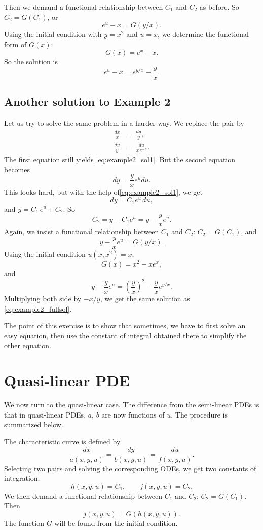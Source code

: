 \documentclass{article}
\begin{document}
Then we demand a functional relationship between $C_1$ and $C_2$ as before.
So $C_2 = G(C_1)$, or
$$
e^u - x = G(y/x).
$$
Using the initial condition with $y = x^2$ and $u = x$,
we determine the functional form of $G(x)$:
$$
G(x) = e^x - x.
$$
So the solution is
\begin{equation}
e^u - x = e^{y/x} - \frac{y}{x}.
\label{eq:example2_fullsol}
\end{equation}


\subsection{Another solution to Example 2}

Let us try to solve the same problem in a harder way.
We replace the pair by
$$
\begin{aligned}
\frac{ dx } { x } &= \frac{ dy } { y}, \\
\frac{ dy } { y } &= \frac{ du } { x \, e^{-u} }.
\end{aligned}
$$
The first equation still yields
\eqref{eq:example2_sol1}.
But the second equation becomes
$$
dy = \frac{y}{x} e^u du.
$$
This looks hard, but with the help of\eqref{eq:example2_sol1},
we get
$$
dy = C_1 e^u \, du,
$$
and $ y = C_1 \, e^u + C_2$.  So
$$
C_2 = y - C_1 e^u = y - \frac y x e^u.
$$
Again, we insist a functional relationship between $C_1$ and $C_2$:
$C_2 = G(C_1)$, and
$$
y - \frac y x e^u = G(y/x).
$$
Using the initial condition $u(x, x^2) = x$,
$$
G(x) = x^2 - x e^x,
$$
and
$$
y - \frac y x e^u = \left(\frac{y}{x}\right)^2  - \frac{y}{x} e^{y/x}.
$$
Multiplying both side by $-x/y$,
we get the same solution as \eqref{eq:example2_fullsol}.

The point of this exercise is to show that
sometimes, we have to first solve an easy equation,
then use the constant of integral obtained there
to simplify the other equation.


\section{Quasi-linear PDE}


We now turn to the quasi-linear case.
%
The difference from the semi-linear PDEs is
that in quasi-linear PDEs, $a$, $b$
are now functions of $u$.
%
The procedure is summarized below.

The characteristic curve is defined by
$$
\frac{ dx } { a(x, y, u) }
=
\frac{ dy } { b(x, y, u) }
=
\frac{ du } { f(x, y, u) }.
$$
Selecting two pairs and solving the corresponding ODEs,
we get two constants of integration.
$$
h(x, y, u) = C_1,
\qquad
j(x, y, u) = C_2.
$$
We then demand a functional relationship between $C_1$ and $C_2$: $C_2 = G(C_1)$.
Then
$$
j(x, y, u) = G(h(x, y, u)).
$$
The function $G$ will be found from the initial condition.
\end{document}
